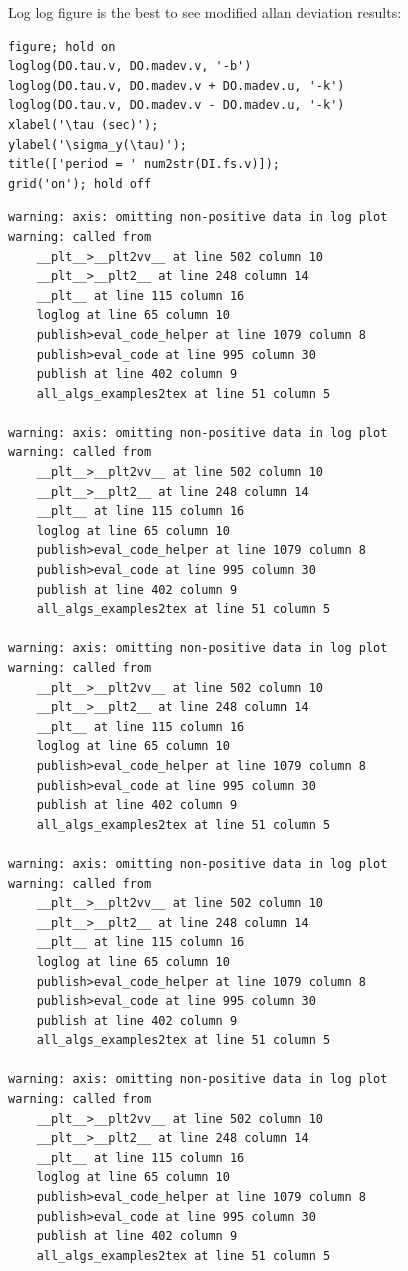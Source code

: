 Log log figure is the best to see modified allan deviation results:

\begin{lstlisting}
figure; hold on
loglog(DO.tau.v, DO.madev.v, '-b')
loglog(DO.tau.v, DO.madev.v + DO.madev.u, '-k')
loglog(DO.tau.v, DO.madev.v - DO.madev.u, '-k')
xlabel('\tau (sec)');
ylabel('\sigma_y(\tau)');
title(['period = ' num2str(DI.fs.v)]);
grid('on'); hold off
\end{lstlisting}
\begin{lstlisting}[language={},xleftmargin=5pt,frame=none]
warning: axis: omitting non-positive data in log plot
warning: called from
    __plt__>__plt2vv__ at line 502 column 10
    __plt__>__plt2__ at line 248 column 14
    __plt__ at line 115 column 16
    loglog at line 65 column 10
    publish>eval_code_helper at line 1079 column 8
    publish>eval_code at line 995 column 30
    publish at line 402 column 9
    all_algs_examples2tex at line 51 column 5
 
warning: axis: omitting non-positive data in log plot
warning: called from
    __plt__>__plt2vv__ at line 502 column 10
    __plt__>__plt2__ at line 248 column 14
    __plt__ at line 115 column 16
    loglog at line 65 column 10
    publish>eval_code_helper at line 1079 column 8
    publish>eval_code at line 995 column 30
    publish at line 402 column 9
    all_algs_examples2tex at line 51 column 5
 
warning: axis: omitting non-positive data in log plot
warning: called from
    __plt__>__plt2vv__ at line 502 column 10
    __plt__>__plt2__ at line 248 column 14
    __plt__ at line 115 column 16
    loglog at line 65 column 10
    publish>eval_code_helper at line 1079 column 8
    publish>eval_code at line 995 column 30
    publish at line 402 column 9
    all_algs_examples2tex at line 51 column 5
 
warning: axis: omitting non-positive data in log plot
warning: called from
    __plt__>__plt2vv__ at line 502 column 10
    __plt__>__plt2__ at line 248 column 14
    __plt__ at line 115 column 16
    loglog at line 65 column 10
    publish>eval_code_helper at line 1079 column 8
    publish>eval_code at line 995 column 30
    publish at line 402 column 9
    all_algs_examples2tex at line 51 column 5
 
warning: axis: omitting non-positive data in log plot
warning: called from
    __plt__>__plt2vv__ at line 502 column 10
    __plt__>__plt2__ at line 248 column 14
    __plt__ at line 115 column 16
    loglog at line 65 column 10
    publish>eval_code_helper at line 1079 column 8
    publish>eval_code at line 995 column 30
    publish at line 402 column 9
    all_algs_examples2tex at line 51 column 5
 

\end{lstlisting}
